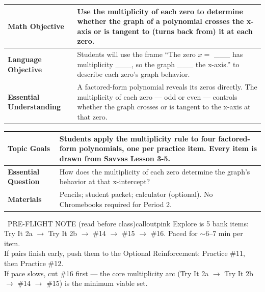 \documentclass[11pt]{article}
\begin{document}

{\small
\renewcommand{\arraystretch}{1.25}
\noindent\begin{tabular}{|p{1.8in}|p{4.8in}|}
\hline
\textbf{Math Objective} & Use the multiplicity of each zero to determine whether the graph of a polynomial crosses the x-axis or is tangent to (turns back from) it at each zero. \\ \hline
\textbf{Language Objective} & Students will use the frame ``The zero \(x=\) \_\_\_ has multiplicity \_\_\_, so the graph \_\_\_ the x-axis.'' to describe each zero's graph behavior. \\ \hline
\textbf{Essential Understanding} & A factored-form polynomial reveals its zeros directly. The multiplicity of each zero --- odd or even --- controls whether the graph crosses or is tangent to the x-axis at that zero. \\ \hline
\end{tabular}
}

{\small
\renewcommand{\arraystretch}{1.25}
\noindent\begin{tabular}{|p{1.8in}|p{4.8in}|}
\hline
\textbf{Topic Goals} & Students apply the multiplicity rule to four factored-form polynomials, one per practice item. Every item is drawn from Savvas Lesson 3-5. \\ \hline
\textbf{Essential Question} & How does the multiplicity of each zero determine the graph's behavior at that x-intercept? \\ \hline
\textbf{Materials} & Pencils; student packet; calculator (optional). No Chromebooks required for Period 2. \\ \hline
\end{tabular}
}

\begin{callout}{\IconPin\ PRE-FLIGHT NOTE (read before class)}{calloutpink}
Explore is 5 bank items: Try It 2a \(\rightarrow\) Try It 2b \(\rightarrow\) \#14 \(\rightarrow\) \#15 \(\rightarrow\) \#16. Paced for \(\sim\)6--7 min per item.\\
If pairs finish early, push them to the Optional Reinforcement: Practice \#11, then Practice \#12.\\
If pace slows, cut \#16 first --- the core multiplicity arc (Try It 2a \(\rightarrow\) Try It 2b \(\rightarrow\) \#14 \(\rightarrow\) \#15) is the minimum viable set.
\end{callout}
\end{document}
